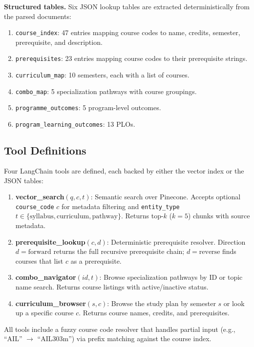 \documentclass[lettersize,journal]{IEEEtran}
\begin{document}
\textbf{Structured tables.} Six JSON lookup tables are extracted deterministically from the parsed documents:
\begin{enumerate}
    \item \texttt{course\_index}: 47 entries mapping course codes to name, credits, semester, prerequisite, and description.
    \item \texttt{prerequisites}: 23 entries mapping course codes to their prerequisite strings.
    \item \texttt{curriculum\_map}: 10 semesters, each with a list of courses.
    \item \texttt{combo\_map}: 5 specialization pathways with course groupings.
    \item \texttt{programme\_outcomes}: 5 program-level outcomes.
    \item \texttt{program\_learning\_outcomes}: 13 PLOs.
\end{enumerate}

\subsection{Tool Definitions}

Four LangChain tools are defined, each backed by either the vector index or the JSON tables:

\begin{enumerate}
    \item \textbf{vector\_search}$(q, c, t)$: Semantic search over Pinecone. Accepts optional \texttt{course\_code} $c$ for metadata filtering and \texttt{entity\_type} $t \in \{\text{syllabus}, \text{curriculum}, \text{pathway}\}$. Returns top-$k$ ($k{=}5$) chunks with source metadata.
    \item \textbf{prerequisite\_lookup}$(c, d)$: Deterministic prerequisite resolver. Direction $d{=}\text{forward}$ returns the full recursive prerequisite chain; $d{=}\text{reverse}$ finds courses that list $c$ as a prerequisite.
    \item \textbf{combo\_navigator}$(id, t)$: Browse specialization pathways by ID or topic name search. Returns course listings with active/inactive status.
    \item \textbf{curriculum\_browser}$(s, c)$: Browse the study plan by semester $s$ or look up a specific course $c$. Returns course names, credits, and prerequisites.
\end{enumerate}

All tools include a fuzzy course code resolver that handles partial input (e.g., ``AIL'' $\rightarrow$ ``AIL303m'') via prefix matching against the course index.
\end{document}
